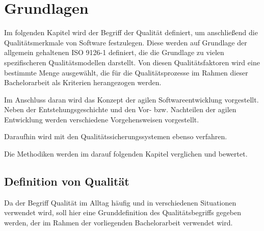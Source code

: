 
\chapter{Grundlagen}



    Im folgenden Kapitel wird der Begriff der Qualität definiert, um anschließend die Qualitätsmerkmale von Software festzulegen. Diese werden auf Grundlage der allgemein gehaltenen ISO 9126-1 definiert, die die Grundlage zu vielen spezifischeren Qualitätsmodellen darstellt. Von diesen Qualitätsfaktoren wird eine bestimmte Menge ausgewählt, die für die Qualitätsprozesse im Rahmen dieser Bachelorarbeit als Kriterien herangezogen werden.

    Im Anschluss daran wird das Konzept der agilen Softwareentwicklung vorgestellt. Neben der Entstehungsgeschichte und den Vor- bzw. Nachteilen der agilen Entwicklung werden verschiedene Vorgehensweisen vorgestellt.

    Daraufhin wird mit den Qualitätssicherungssystemen ebenso verfahren.

    Die Methodiken werden im darauf folgenden Kapitel verglichen und bewertet.

%
%
    \section{Definition von Qualität}

        Da der Begriff Qualität im Alltag häufig und in verschiedenen Situationen verwendet wird, soll hier eine Grunddefinition des Qualitätsbegriffs gegeben werden, der im Rahmen der vorliegenden Bachelorarbeit verwendet wird.

